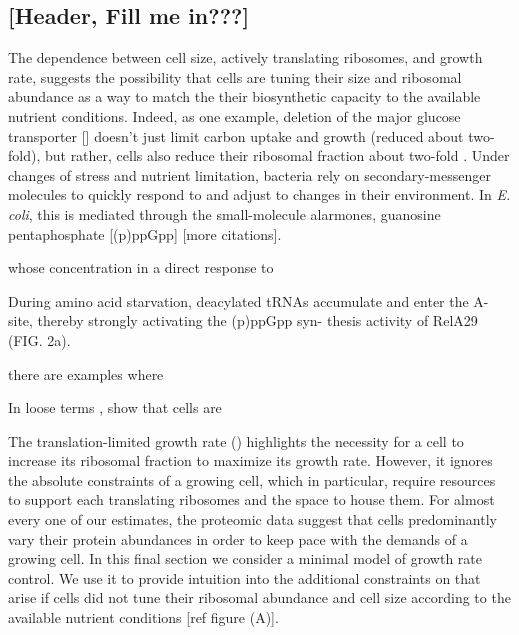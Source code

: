 



\subsection{[Header, Fill me in???]}

The dependence between cell size, actively translating ribosomes, and growth
rate, suggests the possibility that cells are tuning their size and ribosomal
abundance as a way to match the their biosynthetic capacity to the available
nutrient conditions. Indeed, as one example, deletion of the major glucose
transporter [] doesn't just limit carbon uptake and growth (reduced about
two-fold), but rather, cells also reduce their ribosomal fraction about two-fold
\citep{dai2016}. Under changes of  stress and nutrient limitation, bacteria rely
on secondary-messenger molecules  to quickly respond to and adjust to changes in
their environment.  In \textit{E. coli}, this is mediated through the
small-molecule alarmones, guanosine pentaphosphate [(p)ppGpp] \citep{dai2016}
[more citations]. 

 whose concentration in a direct response to

During amino acid starvation, deacylated tRNAs accumulate and enter the A-site, thereby strongly activating the (p)ppGpp syn- thesis activity of RelA29 (FIG. 2a).



there
are examples where

In loose terms , show that cells are


The translation-limited growth rate ()
highlights the necessity for a cell to increase its ribosomal fraction to
maximize its growth rate. However, it ignores the absolute constraints of a
growing cell, which in particular, require resources to support each translating
ribosomes and the space to house them. For almost every one of our estimates,
the proteomic data suggest that cells predominantly vary their protein
abundances in order to keep pace with the demands of a growing cell. In this
final section we consider a minimal model of growth rate control. We use it to
provide intuition into the additional constraints on that arise if cells did not
tune their ribosomal abundance and cell size according to the available nutrient
conditions [ref figure (A)].

